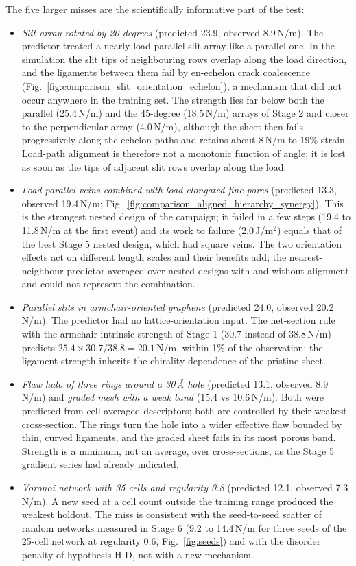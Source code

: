 The five larger misses are the scientifically informative part of the test:
\begin{itemize}
\item \emph{Slit array rotated by 20 degrees} (predicted 23.9, observed 8.9\,N/m). The predictor treated a nearly load-parallel slit array like a parallel one. In the simulation the slit tips of neighbouring rows overlap along the load direction, and the ligaments between them fail by en-echelon crack coalescence (Fig.~\ref{fig:comparison_slit_orientation_echelon}), a mechanism that did not occur anywhere in the training set. The strength lies far below both the parallel (25.4\,N/m) and the 45-degree (18.5\,N/m) arrays of Stage 2 and closer to the perpendicular array (4.0\,N/m), although the sheet then fails progressively along the echelon paths and retains about 8\,N/m to 19\% strain. Load-path alignment is therefore not a monotonic function of angle; it is lost as soon as the tips of adjacent slit rows overlap along the load.
\item \emph{Load-parallel veins combined with load-elongated fine pores} (predicted 13.3, observed 19.4\,N/m; Fig.~\ref{fig:comparison_aligned_hierarchy_synergy}). This is the strongest nested design of the campaign; it failed in a few steps (19.4 to 11.8\,N/m at the first event) and its work to failure (2.0\,J/m$^2$) equals that of the best Stage 5 nested design, which had square veins. The two orientation effects act on different length scales and their benefits add; the nearest-neighbour predictor averaged over nested designs with and without alignment and could not represent the combination.
\item \emph{Parallel slits in armchair-oriented graphene} (predicted 24.0, observed 20.2\,N/m). The predictor had no lattice-orientation input. The net-section rule with the armchair intrinsic strength of Stage 1 (30.7 instead of 38.8\,N/m) predicts $25.4 \times 30.7/38.8 = 20.1$\,N/m, within 1\% of the observation: the ligament strength inherits the chirality dependence of the pristine sheet.
\item \emph{Flaw halo of three rings around a 30\,\AA{} hole} (predicted 13.1, observed 8.9\,N/m) and \emph{graded mesh with a weak band} (15.4 vs 10.6\,N/m). Both were predicted from cell-averaged descriptors; both are controlled by their weakest cross-section. The rings turn the hole into a wider effective flaw bounded by thin, curved ligaments, and the graded sheet fails in its most porous band. Strength is a minimum, not an average, over cross-sections, as the Stage 5 gradient series had already indicated.
\item \emph{Voronoi network with 35 cells and regularity 0.8} (predicted 12.1, observed 7.3\,N/m). A new seed at a cell count outside the training range produced the weakest holdout. The miss is consistent with the seed-to-seed scatter of random networks measured in Stage 6 (9.2 to 14.4\,N/m for three seeds of the 25-cell network at regularity 0.6, Fig.~\ref{fig:seeds}) and with the disorder penalty of hypothesis H-D, not with a new mechanism.
\end{itemize}

